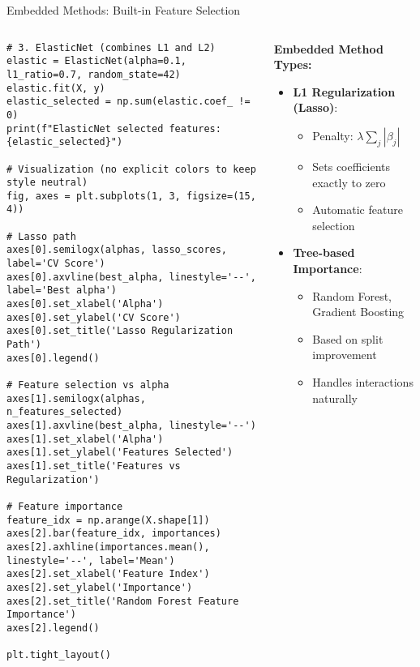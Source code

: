 \documentclass[aspectratio=169,11pt]{beamer}
\begin{document}
\begin{frame}[fragile]{Embedded Methods: Built-in Feature Selection}
\begin{columns}
\begin{column}{0.55\textwidth}
\begin{lstlisting}
# 3. ElasticNet (combines L1 and L2)
elastic = ElasticNet(alpha=0.1, l1_ratio=0.7, random_state=42)
elastic.fit(X, y)
elastic_selected = np.sum(elastic.coef_ != 0)
print(f"ElasticNet selected features: {elastic_selected}")

# Visualization (no explicit colors to keep style neutral)
fig, axes = plt.subplots(1, 3, figsize=(15, 4))

# Lasso path
axes[0].semilogx(alphas, lasso_scores, label='CV Score')
axes[0].axvline(best_alpha, linestyle='--', label='Best alpha')
axes[0].set_xlabel('Alpha')
axes[0].set_ylabel('CV Score')
axes[0].set_title('Lasso Regularization Path')
axes[0].legend()

# Feature selection vs alpha
axes[1].semilogx(alphas, n_features_selected)
axes[1].axvline(best_alpha, linestyle='--')
axes[1].set_xlabel('Alpha')
axes[1].set_ylabel('Features Selected')
axes[1].set_title('Features vs Regularization')

# Feature importance
feature_idx = np.arange(X.shape[1])
axes[2].bar(feature_idx, importances)
axes[2].axhline(importances.mean(), linestyle='--', label='Mean')
axes[2].set_xlabel('Feature Index')
axes[2].set_ylabel('Importance')
axes[2].set_title('Random Forest Feature Importance')
axes[2].legend()

plt.tight_layout()
\end{lstlisting}
\end{column}
\begin{column}{0.45\textwidth}
\textbf{Embedded Method Types:}

\begin{itemize}
\item \textbf{L1 Regularization (Lasso)}:
  \begin{itemize}
  \item Penalty: $\lambda \sum_j |\beta_j|$
  \item Sets coefficients exactly to zero
  \item Automatic feature selection
  \end{itemize}

\item \textbf{Tree-based Importance}:
  \begin{itemize}
  \item Random Forest, Gradient Boosting
  \item Based on split improvement
  \item Handles interactions naturally
  \end{itemize}


\end{itemize}
\end{column}
\end{columns}
\end{frame}
\end{document}
